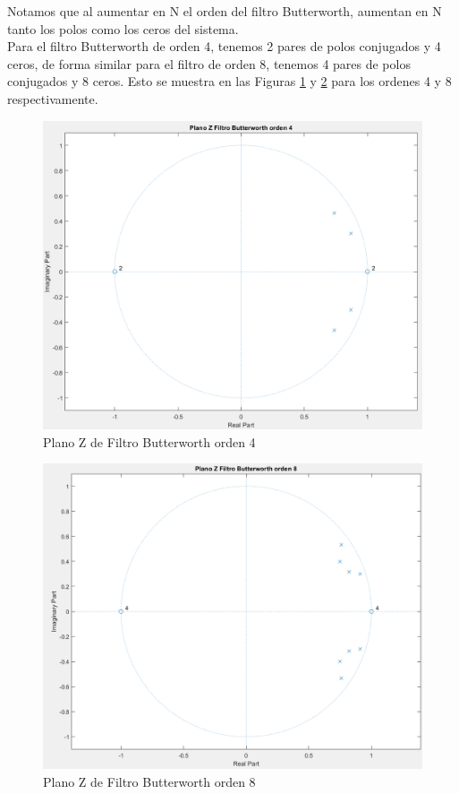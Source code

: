 \documentclass[letterpaper,onecolumn,10pt,journal,final]{IEEEtran}
\begin{document}
\begin{enumerate}[1)]
        Notamos que al aumentar en N el orden del filtro Butterworth, aumentan en N tanto los polos como los ceros del sistema.\\
        Para el filtro Butterworth de orden 4, tenemos 2 pares de polos conjugados y 4 ceros, de forma similar para el filtro de orden 8, tenemos 4 pares de polos conjugados y 8 ceros. Esto se muestra en las Figuras \ref{fig:IV_3)1} y \ref{fig:IV_3)2} para los ordenes 4 y 8 respectivamente.
        
                \begin{figure}[H]
                \centering
                \includegraphics[width=0.75 \linewidth]{Figuras/IV_3)1.png}
                \caption{Plano Z de Filtro Butterworth orden 4}
                \label{fig:IV_3)1}
                \end{figure}
                
                \begin{figure}[H]
                \centering
                \includegraphics[width=0.75 \linewidth]{Figuras/IV_3)2.png}
                \caption{Plano Z de Filtro Butterworth orden 8}
                \label{fig:IV_3)2}
                \end{figure}
        
\end{enumerate}
\end{document}

